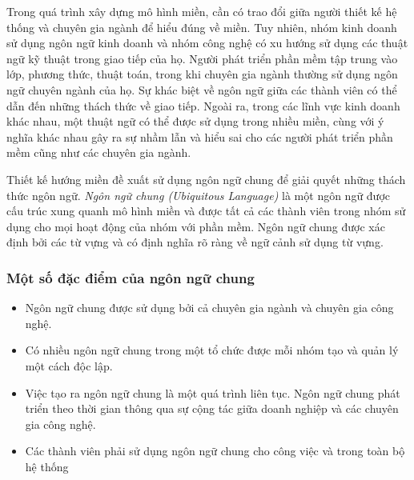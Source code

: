 


Trong quá trình xây dựng mô hình miền, cần có trao đổi giữa người thiết kế hệ thống và chuyên gia ngành để hiểu đúng về miền. Tuy nhiên, nhóm kinh doanh sử dụng ngôn ngữ kinh doanh và nhóm công nghệ có xu hướng sử dụng các thuật ngữ kỹ thuật trong giao tiếp của họ. Người phát triển phần mềm tập trung vào lớp, phương thức, thuật toán, trong khi chuyên gia ngành thường sử dụng ngôn ngữ chuyên ngành của họ. Sự khác biệt về ngôn ngữ giữa các thành viên có thể dẫn đến những thách thức về giao tiếp. Ngoài ra, trong các lĩnh vực kinh doanh khác nhau, một thuật ngữ có thể được sử dụng trong nhiều miền, cùng với ý nghĩa khác nhau gây ra sự nhầm lẫn và hiểu sai cho các người phát triển phần mềm cũng như các chuyên gia ngành.

Thiết kế hướng miền đề xuất sử dụng ngôn ngữ chung để giải quyết những thách thức ngôn ngữ. \emph{Ngôn ngữ chung (Ubiquitous Language)} là một ngôn ngữ được cấu trúc xung quanh mô hình miền và được tất cả các thành viên trong nhóm sử dụng cho mọi hoạt động của nhóm với phần mềm. Ngôn ngữ chung được xác định bởi các từ vựng và có định nghĩa rõ ràng về ngữ cảnh sử dụng từ vựng.

\subsubsection{Một số đặc điểm của ngôn ngữ chung}

\begin{itemize}

\item Ngôn ngữ chung được sử dụng bởi cả chuyên gia ngành và chuyên gia công nghệ.

\item Có nhiều ngôn ngữ chung trong một tổ chức được mỗi nhóm tạo và quản lý một cách độc lập.

\item Việc tạo ra ngôn ngữ chung là một quá trình liên tục. Ngôn ngữ chung phát triển theo thời gian thông qua sự cộng tác giữa doanh nghiệp và các chuyên gia công nghệ.

\item Các thành viên phải sử dụng ngôn ngữ chung cho công việc và trong toàn bộ hệ thống

\end{itemize}

